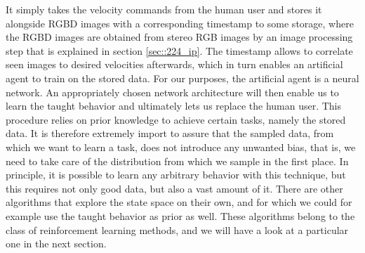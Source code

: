 It simply takes the velocity commands from the human user and stores it alongside RGBD images with a corresponding timestamp to some storage, where the RGBD images are obtained from stereo RGB images by an image processing step that is explained in section \ref{sec::224_ip}. The timestamp allows to correlate seen images to desired velocities afterwards, which in turn enables an artificial agent to train on the stored data. For our purposes, the artificial agent is a neural network. An appropriately chosen network architecture will then enable us to learn the taught behavior and ultimately lets us replace the human user. This procedure relies on prior knowledge to achieve certain tasks, namely the stored data. It is therefore extremely import to assure that the sampled data, from which we want to learn a task, does not introduce any unwanted bias, that is, we need to take care of the distribution from which we sample in the first place. In principle, it is possible to learn any arbitrary behavior with this technique, but this requires not only good data, but also a vast amount of it. There are other algorithms that explore the state space on their own, and for which we could for example use the taught behavior as prior as well. These algorithms belong to the class of reinforcement learning methods, and we will have a look at a particular one in the next section.